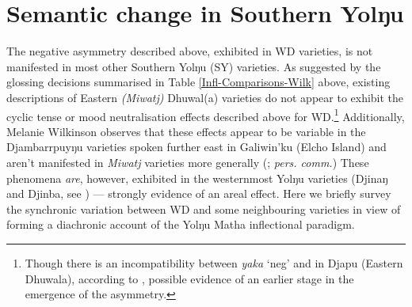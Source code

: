 





\section{Semantic change in Southern Yolŋu}


The negative asymmetry described above, exhibited in WD varieties, is not manifested in most other Southern Yolŋu (SY) varieties. As suggested by the glossing decisions summarised in Table \ref{Infl-Comparisons-Wilk} above, existing descriptions of Eastern \textit{(Miwatj)} Dhuwal(a) varieties \citep{Morphy1983,Heath1980} do not appear to exhibit the cyclic tense or mood neutralisation effects described above for WD.\footnote{Though there is an incompatibility between \textit{yaka} `\gls{neg}' and \III{} in Djapu (Eastern Dhuwala), according to \citet[72]{Morphy1983}, possible evidence of an earlier stage in the emergence of the asymmetry.} Additionally, Melanie Wilkinson observes that these effects appear to be variable in the Djambarrpuyŋu varieties spoken further east in Galiwin'ku (Elcho Island) and aren't manifested in \textit{Miwatj} varieties more generally (\citeyear[431, 359\textit{ff}]{Wilkinson1991}; \textit{pers. comm.}) These phenomena \textit{are}, however, exhibited in the westernmost Yolŋu varieties (Djinaŋ and Djinba, see \citealp[192]{Waters1989}) --- strongly evidence of an areal effect. Here we briefly survey the synchronic variation between WD and some neighbouring varieties in view of forming a diachronic account of the Yolŋu Matha inflectional paradigm.


